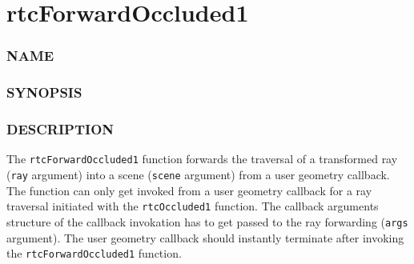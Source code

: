 \section{rtcForwardOccluded1}\label{rtcforwardoccluded1}

\subsubsection{NAME}\label{name}

\begin{Shaded}
\begin{Highlighting}[]
\OperatorTok{{-}}
\end{Highlighting}
\end{Shaded}

\subsubsection{SYNOPSIS}\label{synopsis}

\begin{Shaded}
\begin{Highlighting}[]

\OperatorTok{(}
   \OperatorTok{*}\OperatorTok{,}
\OperatorTok{,}
  \OperatorTok{*}\OperatorTok{,}
   
\OperatorTok{);}
\end{Highlighting}
\end{Shaded}

\subsubsection{DESCRIPTION}\label{description}

The \texttt{rtcForwardOccluded1} function forwards the traversal of a
transformed ray (\texttt{ray} argument) into a scene (\texttt{scene}
argument) from a user geometry callback. The function can only get
invoked from a user geometry callback for a ray traversal initiated with
the \texttt{rtcOccluded1} function. The callback arguments structure of
the callback invokation has to get passed to the ray forwarding
(\texttt{args} argument). The user geometry callback should instantly
terminate after invoking the \texttt{rtcForwardOccluded1} function.

